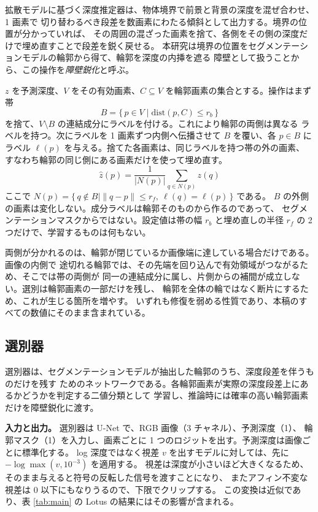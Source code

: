 \documentclass[conference]{IEEEtran}
\begin{document}
拡散モデルに基づく深度推定器は、物体境界で前景と背景の深度を混ぜ合わせ、1 画素で
切り替わるべき段差を数画素にわたる傾斜として出力する。境界の位置が分かっていれば、
その周囲の混ざった画素を捨て、各側をその側の深度だけで埋め直すことで段差を鋭く戻せる。
本研究は境界の位置をセグメンテーションモデルの輪郭から得て、輪郭を深度の内挿を遮る
障壁として扱うことから、この操作を\emph{障壁鋭化}と呼ぶ。

$z$ を予測深度、$V$ をその有効画素、$C \subseteq V$ を輪郭画素の集合とする。操作はまず帯
\begin{equation}
B = \{\, p \in V \mid \mathrm{dist}(p, C) \le r_b \,\}
\end{equation}
を捨て、$V \setminus B$ の連結成分にラベルを付ける。これにより輪郭の両側は異なる
ラベルを持つ。次にラベルを 1 画素ずつ内側へ伝播させて $B$ を覆い、各 $p \in B$ に
ラベル $\ell(p)$ を与える。捨てた各画素は、同じラベルを持つ帯の外の画素、
すなわち輪郭の同じ側にある画素だけを使って埋め直す。
\begin{equation}
\hat z(p) = \frac{1}{|N(p)|} \sum_{q \in N(p)} z(q)
\end{equation}
ここで $N(p) = \{\, q \notin B \mid \|q - p\| \le r_f,\ \ell(q) = \ell(p) \,\}$ である。
$B$ の外側の画素は変化しない。成分ラベルは輪郭そのものから作るのであって、
セグメンテーションマスクからではない。設定値は帯の幅 $r_b$ と埋め直しの半径 $r_f$ の
2 つだけで、学習するものは何もない。

両側が分かれるのは、輪郭が閉じているか画像端に達している場合だけである。画像の内側で
途切れる輪郭では、その先端を回り込んで有効領域がつながるため、そこでは帯の両側が
同一の連結成分に属し、片側からの補間が成立しない。選別は輪郭画素の一部だけを残し、
輪郭を全体の輪ではなく断片にするため、これが生じる箇所を増やす。
いずれも修復を弱める性質であり、本稿のすべての数値にそのまま含まれている。

\subsection{選別器}
\label{sec:selector}

選別器は、セグメンテーションモデルが抽出した輪郭のうち、深度段差を伴うものだけを残す
ためのネットワークである。各輪郭画素が実際の深度段差上にあるかどうかを判定する二値分類として
学習し、推論時には確率の高い輪郭画素だけを障壁鋭化に渡す。

\textbf{入力と出力。} 選別器は U-Net で、RGB 画像（3 チャネル）、予測深度（1）、
輪郭マスク（1）を入力し、画素ごとに 1 つのロジットを出す。予測深度は画像ごとに標準化する。
log 深度ではなく視差 $v$ を出すモデルに対しては、先に $-\log\max(v, 10^{-3})$ を適用する。
視差は深度が小さいほど大きくなるため、そのまま与えると符号の反転した信号を渡すことになり、
またアフィン不変な視差は 0 以下にもなりうるので、下限でクリップする。
この変換は近似であり、表 \ref{tab:main} の Lotus の結果にはその影響が含まれる。
\end{document}
